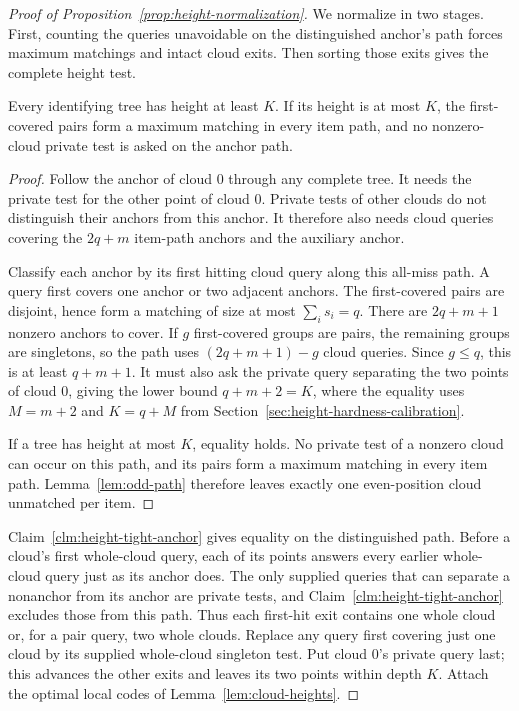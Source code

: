 \begin{proof}[Proof of Proposition~\ref{prop:height-normalization}]
We normalize in two stages. First, counting the queries unavoidable
on the distinguished anchor's path forces maximum matchings and intact
cloud exits. Then sorting those exits gives the complete height test.

\begin{claim}
\label{clm:height-tight-anchor}
Every identifying tree has height at least $K$. If its height is at
most $K$, the first-covered pairs form a maximum matching in every
item path, and no nonzero-cloud private test is asked on the anchor
path.
\end{claim}
\begin{proof}
Follow the anchor of cloud $0$ through any complete tree. It needs the private
test for the other point of cloud $0$. Private tests of other
clouds do not distinguish their anchors from this anchor.
It therefore also needs cloud queries covering the $2q+m$ item-path
anchors and the auxiliary anchor.

Classify each anchor by its first hitting cloud query along this
all-miss path. A query first covers one anchor or two adjacent
anchors. The first-covered pairs are disjoint, hence form a
matching of size at most $\sum_i s_i=q$.
There are $2q+m+1$ nonzero anchors to cover. If $g$ first-covered
groups are pairs, the remaining groups are singletons, so the path
uses $(2q+m+1)-g$ cloud queries. Since $g\le q$, this is at least
$q+m+1$. It must also ask the private query separating the two
points of cloud $0$, giving the lower bound
$q+m+2=K$, where the equality uses $M=m+2$ and $K=q+M$
from Section~\ref{sec:height-hardness-calibration}.

If a tree has height at most $K$, equality holds. No private test
of a nonzero cloud can occur on this path, and its pairs form a
maximum matching in every item path. Lemma~\ref{lem:odd-path}
therefore leaves exactly one even-position cloud unmatched per item.
\end{proof}

Claim~\ref{clm:height-tight-anchor} gives equality on the
distinguished path. Before a cloud's first whole-cloud query, each of
its points answers every earlier whole-cloud query just as its anchor
does. The only supplied queries that can separate a nonanchor from
its anchor are private tests, and Claim~\ref{clm:height-tight-anchor}
excludes those from this path. Thus each first-hit exit contains one
whole cloud or, for a pair query, two whole clouds.
Replace any query first covering just one cloud by its supplied
whole-cloud singleton test. Put cloud $0$'s private query last;
this advances the other exits and leaves its two points within
depth $K$. Attach the optimal local codes of
Lemma~\ref{lem:cloud-heights}.


\end{proof}
